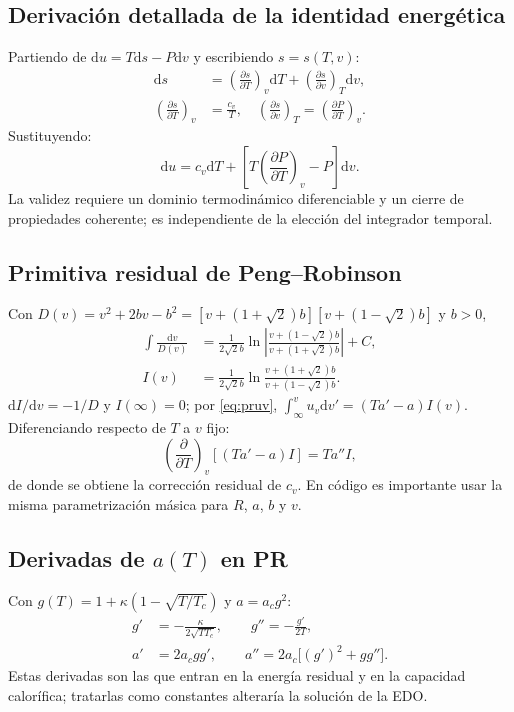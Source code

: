 \documentclass[11pt,letterpaper]{article}
\newcommand{\dd}{\mathrm{d}}
\begin{document}
\subsection{Derivación detallada de la identidad energética}
Partiendo de $\dd u=T\dd s-P\dd v$ y escribiendo $s=s(T,v)$:
\begin{align}
\dd s&=\left(\frac{\partial s}{\partial T}\right)_v\dd T+\left(\frac{\partial s}{\partial v}\right)_T\dd v,\\
\left(\frac{\partial s}{\partial T}\right)_v&=\frac{c_v}{T},\quad \left(\frac{\partial s}{\partial v}\right)_T=\left(\frac{\partial P}{\partial T}\right)_v.
\end{align}
Sustituyendo:
\begin{equation}\dd u=c_v\dd T+\left[T\left(\frac{\partial P}{\partial T}\right)_v-P\right]\dd v.\end{equation}
La validez requiere un dominio termodinámico diferenciable y un cierre de propiedades coherente; es independiente de la elección del integrador temporal.

\subsection{Primitiva residual de Peng--Robinson}
Con $D(v)=v^2+2bv-b^2=[v+(1+\sqrt2)b][v+(1-\sqrt2)b]$ y $b>0$,
\begin{align}
\int\frac{\dd v}{D(v)}&=\frac{1}{2\sqrt2 b}\ln\left|\frac{v+(1-\sqrt2)b}{v+(1+\sqrt2)b}\right|+C,\\
I(v)&=\frac{1}{2\sqrt2 b}\ln\frac{v+(1+\sqrt2)b}{v+(1-\sqrt2)b}.
\end{align}
$\dd I/\dd v=-1/D$ y $I(\infty)=0$; por \eqref{eq:pruv}, $\int_\infty^v u_v\dd v'=(Ta'-a)I(v)$. Diferenciando respecto de $T$ a $v$ fijo:
\begin{equation}\left(\frac{\partial}{\partial T}\right)_v[(Ta'-a)I]=Ta''I,\end{equation}
de donde se obtiene la corrección residual de $c_v$. En código es importante usar la misma parametrización másica para $R$, $a$, $b$ y $v$.

\subsection{Derivadas de $a(T)$ en PR}
Con $g(T)=1+\kappa(1-\sqrt{T/T_c})$ y $a=a_cg^2$:
\begin{align}
g'&=-\frac{\kappa}{2\sqrt{TT_c}},\qquad g''=-\frac{g'}{2T},\\
a'&=2a_cgg',\qquad a''=2a_c\big[(g')^2+gg''\big].
\end{align}
Estas derivadas son las que entran en la energía residual y en la capacidad calorífica; tratarlas como constantes alteraría la solución de la EDO.
\end{document}
